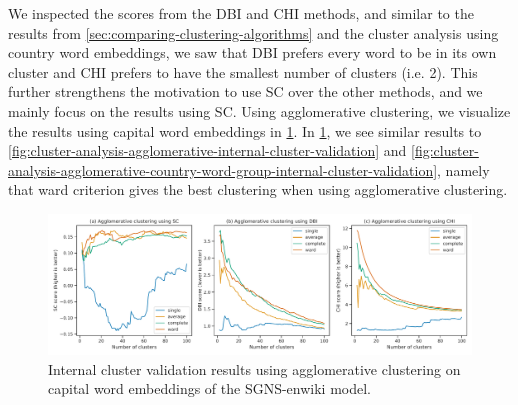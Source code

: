 We inspected the scores from the DBI and CHI methods, and similar to the results from \cref{sec:comparing-clustering-algorithms} and the cluster analysis using country word embeddings, we saw that DBI prefers every word to be in its own cluster and CHI prefers to have the smallest number of clusters (i.e. 2). This further strengthens the motivation to use SC over the other methods, and we mainly focus on the results using SC. Using agglomerative clustering, we visualize the results using capital word embeddings in \cref{fig:cluster-analysis-agglomerative-country-capitals-word-group-internal-cluster-validation}. In \cref{fig:cluster-analysis-agglomerative-country-capitals-word-group-internal-cluster-validation}, we see similar results to \cref{fig:cluster-analysis-agglomerative-internal-cluster-validation} and \cref{fig:cluster-analysis-agglomerative-country-word-group-internal-cluster-validation}, namely that ward criterion gives the best clustering when using agglomerative clustering.
\begin{figure}[H]
    \centering
    \includegraphics[width=\textwidth]{thesis/figures/cluster-analysis-agglomerative-country-capitals-word-group-internal-cluster-validation.pdf}
    \caption{Internal cluster validation results using agglomerative clustering on capital word embeddings of the SGNS-enwiki model.}
    \label{fig:cluster-analysis-agglomerative-country-capitals-word-group-internal-cluster-validation}
\end{figure}


